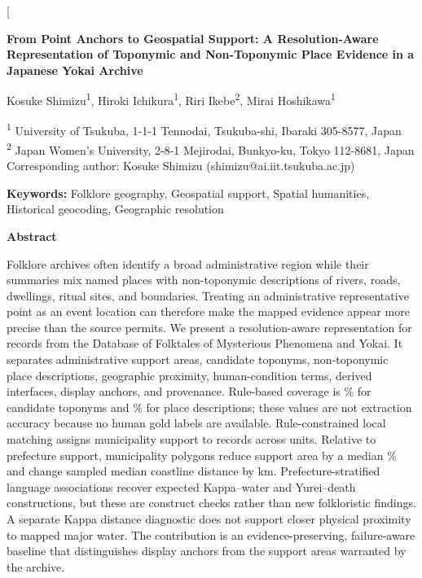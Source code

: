 \documentclass[9pt,twocolumn,a4paper]{extarticle}
\begin{document}
\twocolumn[{%
\vspace*{0.5\baselineskip}
\begin{center}
{\fontsize{12}{14}\selectfont\bfseries
From Point Anchors to Geospatial Support: A Resolution-Aware Representation of Toponymic and Non-Toponymic Place Evidence in a Japanese Yokai Archive\par}
\vspace{1em}
{\fontsize{10}{12}\selectfont
Kosuke Shimizu\textsuperscript{1}, Hiroki Ichikura\textsuperscript{1}, Riri Ikebe\textsuperscript{2}, Mirai Hoshikawa\textsuperscript{1}\par}
\vspace{0.4em}
{\fontsize{9}{11}\selectfont
\textsuperscript{1} University of Tsukuba, 1-1-1 Tennodai, Tsukuba-shi, Ibaraki 305-8577, Japan\\
\textsuperscript{2} Japan Women's University, 2-8-1 Mejirodai, Bunkyo-ku, Tokyo 112-8681, Japan\\
Corresponding author: Kosuke Shimizu (shimizu@ai.iit.tsukuba.ac.jp)}
\end{center}
\vspace{1.2em}

{\noindent\textbf{Keywords:} Folklore geography, Geospatial support, Spatial humanities, Historical geocoding, Geographic resolution\par}
\vspace{\baselineskip}

{\noindent\textbf{Abstract}\par}
\vspace{0.4\baselineskip}
\noindent

Folklore archives often identify a broad administrative region while their summaries mix named places with non-toponymic descriptions of rivers, roads, dwellings, ritual sites, and boundaries. Treating an administrative representative point as an event location can therefore make the mapped evidence appear more precise than the source permits. We present a resolution-aware representation for \ArchiveRecords{} records from the Database of Folktales of Mysterious Phenomena and Yokai. It separates administrative support areas, candidate toponyms, non-toponymic place descriptions, geographic proximity, human-condition terms, derived interfaces, display anchors, and provenance. Rule-based coverage is \CandidateToponymPercent\% for candidate toponyms and \PlaceDescriptionPercent\% for place descriptions; these values are not extraction accuracy because no human gold labels are available. Rule-constrained local matching assigns municipality support to \MunicipalityAnchorRecords{} records across \MunicipalitySupportUnits{} units. Relative to prefecture support, municipality polygons reduce support area by a median \MedianAreaReduction\% and change sampled median coastline distance by \MedianCoastSensitivity{} km. Prefecture-stratified language associations recover expected Kappa--water and Yurei--death constructions, but these are construct checks rather than new folkloristic findings. A separate Kappa distance diagnostic does not support closer physical proximity to mapped major water. The contribution is an evidence-preserving, failure-aware baseline that distinguishes display anchors from the support areas warranted by the archive.

}
\end{document}
